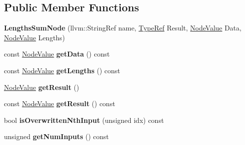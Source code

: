 \subsection*{Public Member Functions}
\begin{DoxyCompactItemize}
\item 
\mbox{\label{classglow_1_1_lengths_sum_node_acd22fb1d7299eb5cd9724cb8dd709a5b}} 
{\bfseries Lengths\+Sum\+Node} (llvm\+::\+String\+Ref name, \hyperlink{structglow_1_1_type}{Type\+Ref} Result, \hyperlink{structglow_1_1_node_value}{Node\+Value} Data, \hyperlink{structglow_1_1_node_value}{Node\+Value} Lengths)
\item 
\mbox{\label{classglow_1_1_lengths_sum_node_a921454ec1466e20ad88e7ac712c6b081}} 
const \hyperlink{structglow_1_1_node_value}{Node\+Value} {\bfseries get\+Data} () const
\item 
\mbox{\label{classglow_1_1_lengths_sum_node_ad3799293f5950c43de4e68f4c72b49fc}} 
const \hyperlink{structglow_1_1_node_value}{Node\+Value} {\bfseries get\+Lengths} () const
\item 
\mbox{\label{classglow_1_1_lengths_sum_node_ace1ecf981303d5bdd03211dedd955604}} 
\hyperlink{structglow_1_1_node_value}{Node\+Value} {\bfseries get\+Result} ()
\item 
\mbox{\label{classglow_1_1_lengths_sum_node_ac2c8de12527c33a3ae590506004053fa}} 
const \hyperlink{structglow_1_1_node_value}{Node\+Value} {\bfseries get\+Result} () const
\item 
\mbox{\label{classglow_1_1_lengths_sum_node_af9f6e971528bb62894981c64cd368ec2}} 
bool {\bfseries is\+Overwritten\+Nth\+Input} (unsigned idx) const
\item 
\mbox{\label{classglow_1_1_lengths_sum_node_aad6d060b0b8323319382e4b817167827}} 
unsigned {\bfseries get\+Num\+Inputs} () const
\item 
\mbox{\label{classglow_1_1_lengths_sum_node_a7ae51482cee1ea057d1e2d26ba5fb23d}} 

\end{DoxyCompactItemize}
